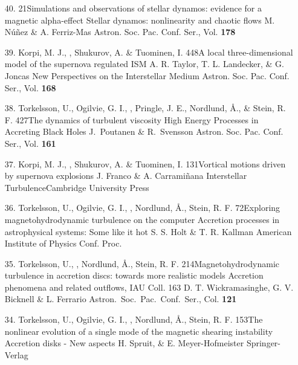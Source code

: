 \begin{itemize}
\item[40.]
\Brandenburg{}
{21}{Simulations and observations of stellar dynamos: evidence for a
magnetic alpha-effect}
{Stellar dynamos: nonlinearity and chaotic flows}
{M. N\'u\~nez \& A. Ferriz-Mas}
{Astron. Soc. Pac. Conf. Ser., Vol. {\bf 178}}

\item[39.]
Korpi, M. J., \Brandenburg, Shukurov, A. \& Tuominen, I.
{448}{A local three-dimensional model of the supernova regulated ISM}
{A. R. Taylor, T. L. Landecker, \& G. Joncas}
{New Perspectives on the Interstellar Medium}
{Astron. Soc. Pac. Conf. Ser., Vol. {\bf 168}}

\item[38.]
Torkelsson, U., Ogilvie, G. I., \Brandenburg, Pringle, J. E.,
Nordlund, \AA., \& Stein, R. F.
{427}{The dynamics of turbulent viscosity}
{High Energy Processes in Accreting Black Holes}
{J.\ Poutanen \& R.\ Svensson}
{Astron. Soc. Pac. Conf. Ser., Vol. {\bf 161}}

\item[37.]
Korpi, M. J., \Brandenburg, Shukurov, A. \&
Tuominen, I.
{131}{Vortical motions driven by supernova explosions}
{J. Franco \& A. Carrami\~nana}
{Interstellar Turbulence}{Cambridge University Press}

\item[36.]
Torkelsson, U., Ogilvie, G. I., \Brandenburg, Nordlund, \AA ., Stein,
R. F.
{72}{Exploring magnetohydrodynamic turbulence on the computer}
{Accretion processes in astrophysical systems:  Some like it hot}
{S. S. Holt \& T. R. Kallman}
{American Institute of Physics Conf. Proc.}

\item[35.]
Torkelsson, U., \Brandenburg, Nordlund, \AA., Stein, R. F.
{214}{Magnetohydrodynamic turbulence in accretion discs:
towards more realistic models}
{Accretion phenomena and related outflows, IAU Coll. 163}
{D. T. Wickramasinghe, G. V. Bicknell \& L. Ferrario}
{Astron.\ Soc.\ Pac.\ Conf.\ Ser., Col. {\bf 121}}

\item[34.]
Torkelsson, U., Ogilvie, G. I., \Brandenburg, Nordlund, \AA.,
Stein, R. F.
{153}{The nonlinear evolution of a single mode of the
magnetic shearing instability}
{Accretion disks - New aspects}
{H. Spruit, \& E. Meyer-Hofmeister}
{Springer-Verlag}


\end{itemize}
